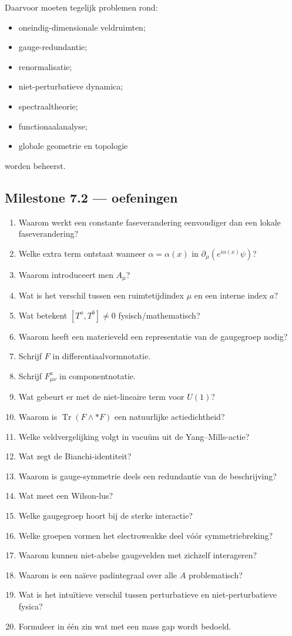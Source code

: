 \documentclass[11pt,a4paper]{article}
\newcommand{\Tr}{\operatorname{Tr}}
\begin{document}
Daarvoor moeten tegelijk problemen rond:
\begin{itemize}
    \item oneindig-dimensionale veldruimten;
    \item gauge-redundantie;
    \item renormalisatie;
    \item niet-perturbatieve dynamica;
    \item spectraaltheorie;
    \item functionaalanalyse;
    \item globale geometrie en topologie
\end{itemize}
worden beheerst.

\subsection{Milestone 7.2 --- oefeningen}

\begin{enumerate}
\item Waarom werkt een constante faseverandering eenvoudiger dan een lokale faseverandering?
\item Welke extra term ontstaat wanneer $\alpha=\alpha(x)$ in $\partial_\mu(e^{i\alpha(x)}\psi)$?
\item Waarom introduceert men $A_\mu$?
\item Wat is het verschil tussen een ruimtetijdindex $\mu$ en een interne index $a$?
\item Wat betekent $[T^a,T^b]\neq0$ fysisch/mathematisch?
\item Waarom heeft een materieveld een representatie van de gaugegroep nodig?
\item Schrijf $F$ in differentiaalvormnotatie.
\item Schrijf $F^a_{\mu\nu}$ in componentnotatie.
\item Wat gebeurt er met de niet-lineaire term voor $U(1)$?
\item Waarom is $\Tr(F\wedge *F)$ een natuurlijke actiedichtheid?
\item Welke veldvergelijking volgt in vacuüm uit de Yang--Mills-actie?
\item Wat zegt de Bianchi-identiteit?
\item Waarom is gauge-symmetrie deels een redundantie van de beschrijving?
\item Wat meet een Wilson-lus?
\item Welke gaugegroep hoort bij de sterke interactie?
\item Welke groepen vormen het electroweakke deel vóór symmetriebreking?
\item Waarom kunnen niet-abelse gaugevelden met zichzelf interageren?
\item Waarom is een naïeve padintegraal over alle $A$ problematisch?
\item Wat is het intuïtieve verschil tussen perturbatieve en niet-perturbatieve fysica?
\item Formuleer in één zin wat met een mass gap wordt bedoeld.
\end{enumerate}
\end{document}
